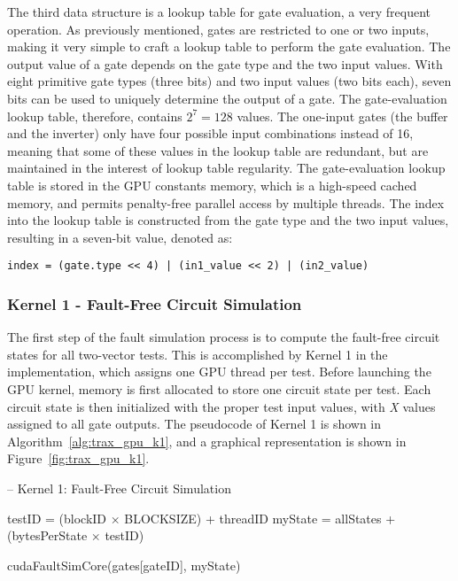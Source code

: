 The third data structure is a lookup table for gate evaluation, a very frequent operation.
%
As previously mentioned, gates are restricted to one or two inputs, making it very simple to craft a lookup table to perform the gate evaluation.
%
The output value of a gate depends on the gate type and the two input values.
%
With eight primitive gate types (three bits) and two input values (two bits each), seven bits can be used to uniquely determine the output of a gate.
%
The gate-evaluation lookup table, therefore, contains $2^7 = 128$ values.
%
The one-input gates (the buffer and the inverter) only have four possible input combinations instead of 16, meaning that some of these values in the lookup table are redundant, but are maintained in the interest of lookup table regularity.
%
The gate-evaluation lookup table is stored in the GPU constants memory, which is a high-speed cached memory, and permits penalty-free parallel access by multiple threads.
%
The index into the lookup table is constructed from the gate type and the two input values, resulting in a seven-bit value, denoted as:

\begin{verbatim}
index = (gate.type << 4) | (in1_value << 2) | (in2_value)
\end{verbatim}

\subsubsection{Kernel 1 - Fault-Free Circuit Simulation}
\label{sec:trax_gpu_k1}

The first step of the fault simulation process is to compute the fault-free circuit states for all two-vector tests.
%
This is accomplished by Kernel 1 in the implementation, which assigns one GPU thread per test.
%
Before launching the GPU kernel, memory is first allocated to store one circuit state per test.
%
Each circuit state is then initialized with the proper test input values, with \textit{X} values assigned to all gate outputs.
%
The pseudocode of Kernel 1 is shown in Algorithm~\ref{alg:trax_gpu_k1}, and a graphical representation is shown in Figure~\ref{fig:trax_gpu_k1}.

\begin{algorithm}
\centering
\caption[GPU Kernel 1: Fault-Free Circuit Simulation]{-- Kernel 1: Fault-Free Circuit Simulation}
\label{alg:trax_gpu_k1}
\begin{algorithmic}[1]
\STATE testID = (blockID $\times$ BLOCKSIZE) + threadID
  \STATE myState = allStates + (bytesPerState $\times$ testID)

    \STATE cudaFaultSimCore(gates[gateID], myState)
  \ENDFOR
\ENDIF
\end{algorithmic}
\end{algorithm}

